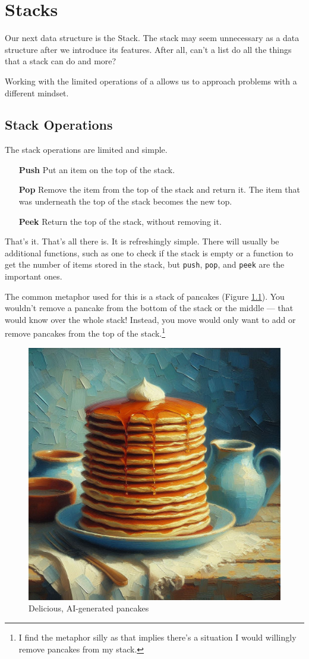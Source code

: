 \chapter{Stacks}
Our next data structure is the Stack.
The stack may seem unnecessary as a data structure after we introduce its features.  
After all, can't a list do all the things that a stack can do and more? 

Working with the limited operations of a allows us to approach problems with a different mindset.

\section{Stack Operations}

The stack operations are limited and simple. 

\begin{enumerate}
	\item[\textbf{Push}] Put an item on the top of the stack.
	\item[\textbf{Pop}] Remove the item from the top of the stack and return it.  The item that was underneath the top of the stack becomes the new top.
	\item[\textbf{Peek}] Return the top of the stack, without removing it.
\end{enumerate}


That's it.  That's all there is.  It is refreshingly simple.
There will usually be additional functions, such as one to check if the stack is empty or a function to get the number of items stored in the stack, but \texttt{push}, \texttt{pop}, and \texttt{peek} are the important ones.


The common metaphor used for this is a stack of pancakes (Figure \ref{fig:pancakeai}).  You wouldn't remove a pancake from the bottom of the stack or the middle --- that would know over the whole stack! Instead, you move would only want to add or remove pancakes from the top of the stack.\footnote{I find the metaphor silly as that implies there's a situation I would willingly remove pancakes from my stack.}

\begin{figure}
	\centering
	\includegraphics[width=0.7\linewidth]{pics/pancake_ai}
	\caption[AI Pancakes]{Delicious, AI-generated pancakes}
	\label{fig:pancakeai}
\end{figure}


